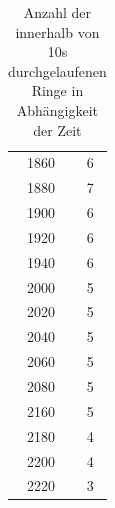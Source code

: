 \begin{table}
\begin{tabular}{c|c}
1860&	6\\ 

1880&	7\\ 

1900&	6\\ 

1920&	6\\ 

1940&	6\\ 

2000&	5\\ 

2020&	5\\ 

2040&	5\\ 

2060&	5\\ 

2080&	5\\ 

2160&	5\\ 

2180&	4\\ 

2200&	4\\ 

2220&	3\\ 

\end{tabular} 

\label{tbl_1}
\caption{Anzahl der innerhalb von 10s durchgelaufenen Ringe in Abhängigkeit der Zeit}
\end{table}

